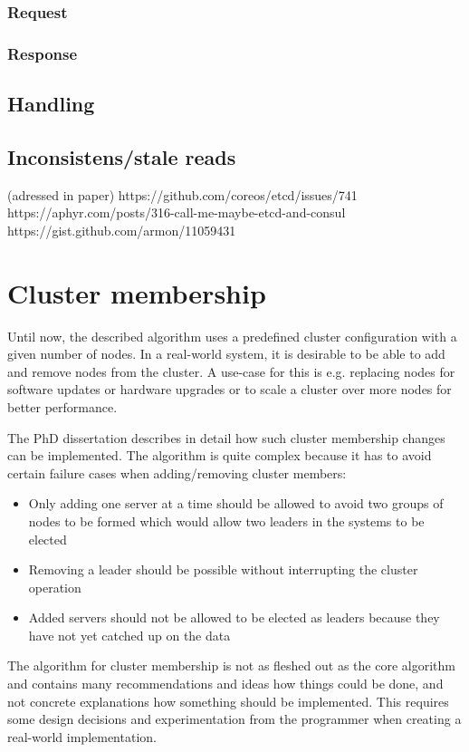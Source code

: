 \subsubsection*{Request}
\subsubsection*{Response}

\subsection{Handling}

\subsection{Inconsistens/stale reads}
(adressed in paper)
https://github.com/coreos/etcd/issues/741
https://aphyr.com/posts/316-call-me-maybe-etcd-and-consul
https://gist.github.com/armon/11059431

\section{Cluster membership}
Until now, the described algorithm uses a predefined cluster configuration with a given number of nodes. In a real-world system, it is desirable to
be able to add and remove nodes from the cluster. A use-case for this is e.g. replacing nodes for software updates or hardware upgrades or to
scale a cluster over more nodes for better performance.

The PhD dissertation \cite{raft_phd_thesis} describes in detail how such cluster membership changes can be implemented.
The algorithm is quite complex because it has to avoid certain failure cases when adding/removing cluster members:

\begin{itemize}
    \item Only adding one server at a time should be allowed to avoid two groups of nodes to be formed which would allow two leaders in the systems to be elected
    \item Removing a leader should be possible without interrupting the cluster operation
    \item Added servers should not be allowed to be elected as leaders because they have not yet catched up on the data
\end{itemize}

The algorithm for cluster membership is not as fleshed out as the core algorithm and contains many recommendations and ideas how things could be done, and not 
concrete explanations how something should be implemented. This requires some design decisions and experimentation from the programmer when creating a real-world implementation.

